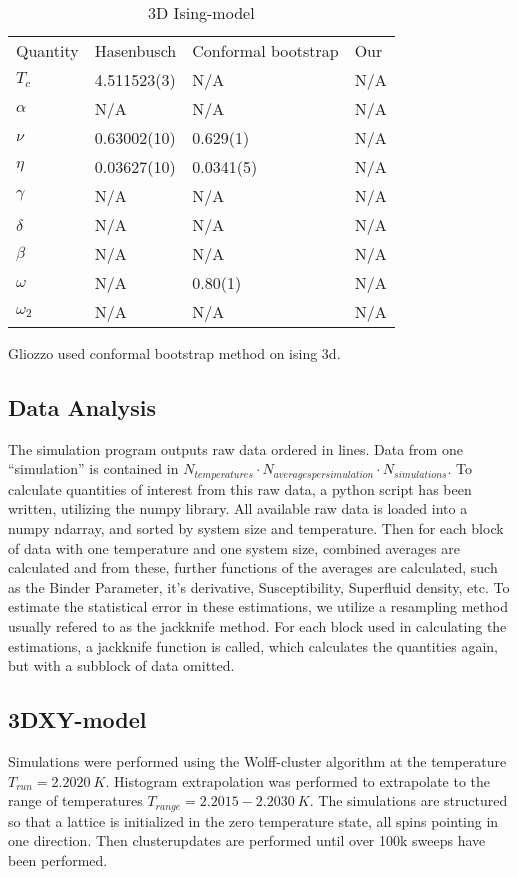 \begin{table}[!htpb]
\begin{center}
\begin{tabular}{l l l l}
  Quantity  & Hasenbusch & Conformal bootstrap& Our\\
  $T_c$	    & 4.511523(3)& N/A		& N/A\\
  $\alpha $ & N/A        & N/A		& N/A\\
  $\nu	  $ & 0.63002(10)& 0.629(1)	& N/A\\
  $\eta   $ & 0.03627(10)& 0.0341(5)	& N/A\\
  $\gamma $ & N/A        & N/A		& N/A\\
  $\delta $ & N/A        & N/A		& N/A\\
  $\beta  $ & N/A        & N/A		& N/A\\
  $\omega $ & N/A        & 0.80(1)	& N/A\\
  $\omega_2$& N/A        & N/A		& N/A\\
\end{tabular}
\end{center}
\caption{3D Ising-model }
\end{table}
Gliozzo used conformal bootstrap method on ising 3d.\cite{Gliozzi2014}
\subsection{Data Analysis}
The simulation program outputs raw data ordered in lines. Data from one ``simulation'' is contained in $N_{temperatures} \cdot N_{averages per simulation} \cdot N_{simulations}$.
To calculate quantities of interest from this raw data, a python script has been written, utilizing the numpy library. All available raw data is loaded into a numpy ndarray, and sorted by system size and temperature. Then for each block of data with one temperature and one system size, combined averages are calculated and from these, further functions of the averages are calculated, such as the Binder Parameter, it's derivative, Susceptibility, Superfluid density, etc. To estimate the statistical error in these estimations, we utilize a resampling method usually refered to as the jackknife method. For each block used in calculating the estimations, a jackknife function is called, which calculates the quantities again, but with a subblock of data omitted.
\subsection{3DXY-model}
Simulations were performed using the Wolff-cluster algorithm at the temperature $T_{run} = 2.2020~K$. Histogram extrapolation was performed to extrapolate to the range of temperatures $T_{range} = 2.2015-2.2030 ~ K$.
The simulations are structured so that a lattice is initialized in the zero temperature state, all spins pointing in one direction. Then clusterupdates are performed until over 100k sweeps have been performed.

